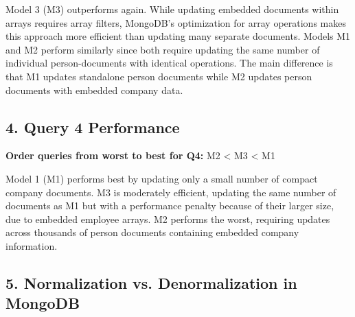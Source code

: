 Model 3 (M3) outperforms again. While updating embedded documents within arrays requires array filters, MongoDB's optimization for array operations makes this approach more efficient than updating many separate documents. Models M1 and M2 perform similarly since both require updating the same number of individual person-documents with identical operations. The main difference is that M1 updates standalone person documents while M2 updates person documents with embedded company data.

\subsection*{4. Query 4 Performance}
\textbf{Order queries from worst to best for Q4:} M2 < M3 < M1

Model 1 (M1) performs best by updating only a small number of compact company documents. M3 is moderately efficient, updating the same number of documents as M1 but with a performance penalty because of their larger size, due to embedded employee arrays. M2 performs the worst, requiring updates across thousands of person documents containing embedded company information.

\subsection*{5. Normalization vs. Denormalization in MongoDB}

